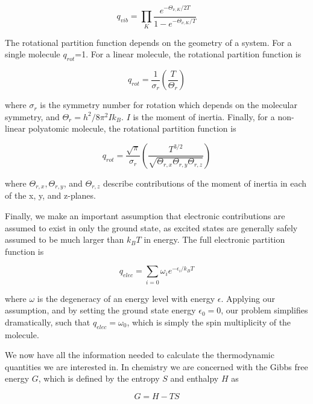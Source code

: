 \begin{equation}
  q_{vib} = \prod_K \frac{e^{-\Theta_{\nu,K}/2T}}{1 - e^{-\Theta_{\nu,K}/T}}
\end{equation}

The rotational partition function depends on the geometry of a system. For a single molecule $q_{rot}$=1. For a linear molecule, the rotational partition function is

\begin{equation}
  q_{rot} = \frac{1}{\sigma_r} \left(\frac{T}{\Theta_r}\right)
\end{equation}

\noindent where $\sigma_r$ is the symmetry number for rotation which depends on the molecular symmetry, and $\Theta_r = h^2/8\pi^2Ik_B$. $I$ is the moment of inertia. Finally, for a non-linear polyatomic molecule, the rotational partition function is

\begin{equation}
  q_{rot} = \frac{\sqrt{\pi}}{\sigma_r}\left(\frac{T^{3/2}}{\sqrt{\Theta_{r,x}\Theta_{r,y}\Theta_{r,z}}}\right)
\end{equation}

\noindent where $\Theta_{r,x}, \Theta_{r,y}$, and $\Theta_{r,z}$ describe contributions of the moment of inertia in each of the x, y, and z-planes.

Finally, we make an important assumption that electronic contributions are assumed to exist in only the ground state, as excited states are generally safely assumed to be much larger than $k_BT$ in energy. The full electronic partition function is

\begin{equation}
  q_{elec} = \sum_{i=0} \omega_i e^{-\epsilon_i/k_BT}
\end{equation}

\noindent where $\omega$ is the degeneracy of an energy level with energy $\epsilon$. Applying our assumption, and by setting the ground state energy $\epsilon_0=0$, our problem simplifies dramatically, such that $q_{elec} = \omega_0$, which is simply the spin multiplicity of the molecule.

We now have all the information needed to calculate the thermodynamic quantities we are interested in. In chemistry we are concerned with the Gibbs free energy $G$, which is defined by the entropy $S$ and enthalpy $H$ as

\begin{equation}
  G = H - TS
\end{equation}

